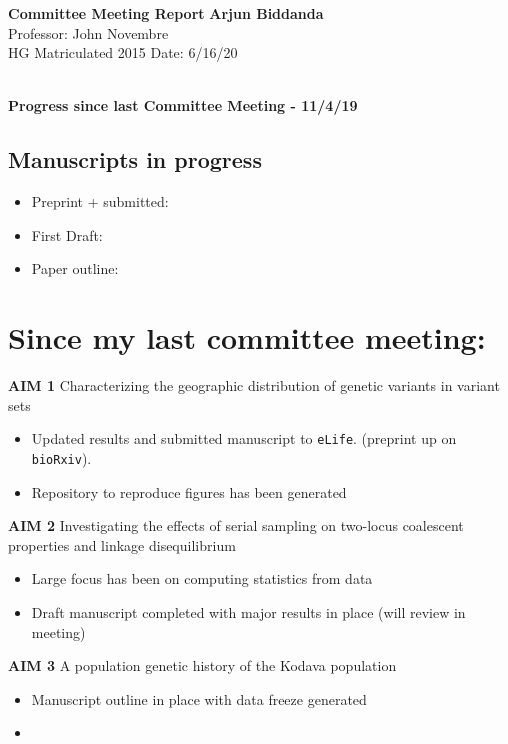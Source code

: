 \documentclass[a4paper, 11pt]{article}
\begin{document}
\noindent
\large\textbf{Committee Meeting Report} \hfill \textbf{Arjun Biddanda} \\
\normalsize  \hfill Professor: John Novembre  \\
HG Matriculated 2015 \hfill Date: 6/16/20 \\
\noindent\makebox[\linewidth]{\rule{\paperwidth}{0.4pt}}

\large\textbf{\\Progress since last Committee Meeting - 11/4/19}

\subsection*{Manuscripts in progress}
\begin{itemize}
		\item Preprint + submitted: 
    \item First Draft: 
    \item Paper outline: 
\end{itemize}

\section*{Since my last committee meeting:}

 \textbf{AIM 1} Characterizing the geographic distribution of genetic variants in variant sets \\
 \begin{itemize}
   \item Updated results and submitted manuscript to \texttt{eLife}. (preprint up on \texttt{bioRxiv}).
   \item Repository to reproduce figures has been generated
 \end{itemize}
 
 \noindent \textbf{AIM 2} Investigating the effects of serial sampling on two-locus coalescent properties and linkage disequilibrium\\
  \begin{itemize}
    \item Large focus has been on computing statistics from data
    \item Draft manuscript completed with major results in place (will review in meeting)
  \end{itemize}

 \noindent \textbf{AIM 3} A population genetic history of the Kodava population\\
  \begin{itemize}
    \item Manuscript outline in place with data freeze generated 
    \item 
  \end{itemize}
\end{document}

